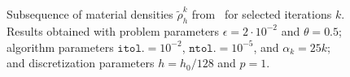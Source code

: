\documentclass[aspectratio=169,xcolor=dvipsnames,11pt]{beamer}
\begin{document}
\begin{frame}
\begin{figure}
\begin{minipage}[c]{0.032\textwidth}
		\\[4pt]~
	\end{minipage}
	\caption{
	Subsequence of material densities $\tilde{\rho}_h^k$ from~ for selected iterations $k$.
	Results obtained with problem parameters $\epsilon = 2\cdot 10^{-2}$ and $\theta = 0.5$; algorithm parameters $\mathtt{itol.} = 10^{-2}$, $\mathtt{ntol.} = 10^{-5}$, and $\alpha_k = 25k$; and discretization parameters $h = h_0/128$ and $p = 1$.
	\label{fig:ElasticCompliance_sequence}}
\end{figure}
\end{frame}
\end{document}
